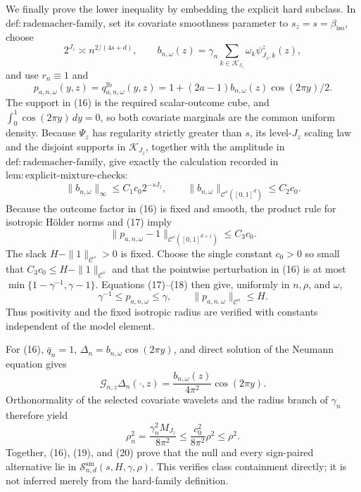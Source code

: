 We finally prove the lower inequality by embedding the explicit hard subclass.  In \(\mathrm{def{:}rademacher\text{-}family}\), set its covariate smoothness parameter to \(s_z=s=\beta_{\mathrm{iso}}\), choose
\[
2^{J_z}\asymp n^{2/(4s+d)},
\qquad
b_{n,\omega}(z)=\gamma_n\sum_{k\in\mathcal K_{J_z}}\omega_k\psi^z_{J_z,k}(z),
\]
and use \(r_n\equiv1\) and
\[
p_{a,n,\omega}(y,z)=q_{a,n,\omega}^{\mathrm{lb}}(y,z)
=1+(2a-1)b_{n,\omega}(z)\cos(2\pi y)/2. \tag{16}
\]
The support in (16) is the required scalar-outcome cube, and \(\int_0^1\cos(2\pi y)\,dy=0\), so both covariate marginals are the common uniform density.  Because \(\Psi_z\) has regularity strictly greater than \(s\), its level-\(J_z\) scaling law and the disjoint supports in \(\mathcal K_{J_z}\), together with the amplitude in \(\mathrm{def{:}rademacher\text{-}family}\), give exactly the calculation recorded in \(\mathrm{lem{:}explicit\text{-}mixture\text{-}checks}\):
\[
\|b_{n,\omega}\|_\infty\le C_1c_0 2^{-sJ_z},
\qquad
\|b_{n,\omega}\|_{\mathcal C^s([0,1]^d)}\le C_2c_0. \tag{17}
\]
Because the outcome factor in (16) is fixed and smooth, the product rule for isotropic H\"older norms and (17) imply
\[
\|p_{a,n,\omega}-1\|_{\mathcal C^s([0,1]^{d+1})}
\le C_3c_0. \tag{18}
\]
The slack \(H-\|1\|_{\mathcal C^s}>0\) is fixed.  Choose the single constant \(c_0>0\) so small that \(C_3c_0\le H-\|1\|_{\mathcal C^s}\) and that the pointwise perturbation in (16) is at most \(\min\{1-\gamma^{-1},\gamma-1\}\).  Equations (17)--(18) then give, uniformly in \(n,\rho\), and \(\omega\),
\[
\gamma^{-1}\le p_{a,n,\omega}\le\gamma,
\qquad
\|p_{a,n,\omega}\|_{\mathcal C^s}\le H. \tag{19}
\]
Thus positivity and the fixed isotropic radius are verified with constants independent of the model element.

For (16), \(\bar q_n=1\), \(\Delta_n=b_{n,\omega}\cos(2\pi y)\), and direct solution of the Neumann equation gives
\[
\mathcal G_{n,z}\Delta_n(\cdot,z)
=\frac{b_{n,\omega}(z)}{4\pi^2}\cos(2\pi y).
\]
Orthonormality of the selected covariate wavelets and the radius branch of \(\gamma_n\) therefore yield
\[
\rho_n^2
=\frac{\gamma_n^2M_{J_z}}{8\pi^2}
\le\frac{c_0^2}{8\pi^2}\rho^2
\le\rho^2. \tag{20}
\]
Together, (16), (19), and (20) prove that the null and every sign-paired alternative lie in \(\mathcal S^{\mathrm{sm}}_{n,d}(s,H,\gamma,\rho)\).  This verifies class containment directly; it is not inferred merely from the hard-family definition.


